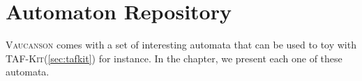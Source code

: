 \documentclass[a4paper]{report}
\newcommand\var[1]{{\ttfamily\itshape #1}}
\newcommand\option[1]{`\texttt{#1}'}
\newcommand{\tafkit}{\textsc{TAF-Kit}\xspace}
\newcommand{\Vauc}{\textsc{Vaucanson}\xspace}
\newenvironment{fnsection}[1]{%
  \renewcommand{\item}[3]{\texttt{##1} \var{##2} & ##3\\}

  \tabularx{\textwidth}{|l|X|}%
    \hline\multicolumn{2}{|c|}{#1} \\\hline%
  }{%
  \endtabularx%
}
\begin{document}



\appendix

\chapter{Automaton Repository}

\Vauc comes with a set of interesting automata that can be used to toy
with \tafkit (\autoref{sec:tafkit}) for instance.  In the chapter, we
present each one of these automata.
\end{document}
